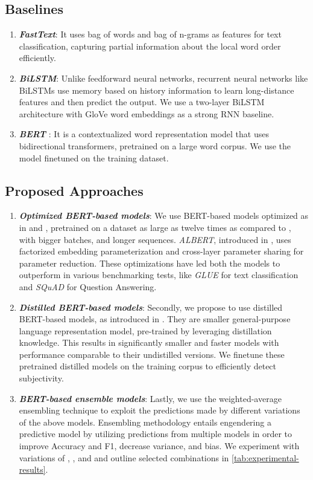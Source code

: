 \documentclass[sigconf,nonacm]{acmart}
\begin{document}
\subsection{Baselines}
\begin{enumerate}
    \item \textit{\textbf{FastText}\cite{joulin2016tricks}}: It uses bag of words and bag of n-grams as features for text classification, capturing partial information about the local word order efficiently.
    \item \textit{\textbf{BiLSTM}}: Unlike feedforward neural networks, recurrent neural networks like BiLSTMs use memory based on history information to learn long-distance features and then predict the output. We use a two-layer BiLSTM architecture with GloVe word embeddings as a strong RNN baseline.
\item \textit{\textbf{BERT} \cite{Devlin2019}}: It is a contextualized word representation model that uses bidirectional transformers, pretrained on a large  word corpus. We use the  model finetuned on the training dataset.
\end{enumerate}

\subsection{Proposed Approaches}
\begin{enumerate}
    \item \textit{\textbf{Optimized BERT-based models}}: We use BERT-based models optimized as in \cite{2020roberta} and \cite{2020albert}, pretrained on a dataset as large as twelve times as compared to , with bigger batches, and longer sequences. \textit{ALBERT}, introduced in \cite{2020albert}, uses factorized embedding parameterization and cross-layer parameter sharing for parameter reduction. These optimizations have led both the models to outperform  in various benchmarking tests, like \textit{GLUE} for text classification and \textit{SQuAD} for Question Answering.
    \item \textit{\textbf{Distilled BERT-based models}}: Secondly, we propose to use distilled BERT-based models, as introduced in \cite{DistilBert}. They are smaller general-purpose language representation model, pre-trained by leveraging distillation knowledge. This results in significantly smaller and faster models with performance comparable to their undistilled versions. We finetune these pretrained distilled models on the training corpus to efficiently detect subjectivity.
\item \textit{\textbf{BERT-based ensemble models}}: Lastly, we use the weighted-average ensembling technique to exploit the predictions made by different variations of the above models. Ensembling methodology entails engendering a predictive model by utilizing predictions from multiple models in order to improve Accuracy and F1, decrease variance, and bias. We experiment with variations of , ,  and  and outline selected combinations in \autoref{tab:experimental-results}.
\end{enumerate}
  
\end{document}
